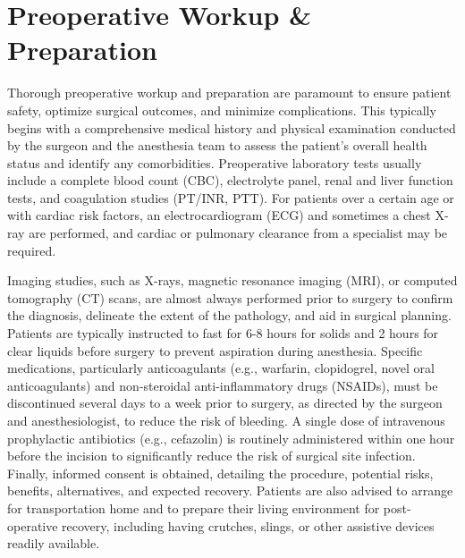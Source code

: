 \section*{Preoperative Workup \& Preparation}
Thorough preoperative workup and preparation are paramount to ensure patient safety, optimize surgical outcomes, and minimize complications. This typically begins with a comprehensive medical history and physical examination conducted by the surgeon and the anesthesia team to assess the patient's overall health status and identify any comorbidities. Preoperative laboratory tests usually include a complete blood count (CBC), electrolyte panel, renal and liver function tests, and coagulation studies (PT/INR, PTT). For patients over a certain age or with cardiac risk factors, an electrocardiogram (ECG) and sometimes a chest X-ray are performed, and cardiac or pulmonary clearance from a specialist may be required.

Imaging studies, such as X-rays, magnetic resonance imaging (MRI), or computed tomography (CT) scans, are almost always performed prior to surgery to confirm the diagnosis, delineate the extent of the pathology, and aid in surgical planning. Patients are typically instructed to fast for 6-8 hours for solids and 2 hours for clear liquids before surgery to prevent aspiration during anesthesia. Specific medications, particularly anticoagulants (e.g., warfarin, clopidogrel, novel oral anticoagulants) and non-steroidal anti-inflammatory drugs (NSAIDs), must be discontinued several days to a week prior to surgery, as directed by the surgeon and anesthesiologist, to reduce the risk of bleeding. A single dose of intravenous prophylactic antibiotics (e.g., cefazolin) is routinely administered within one hour before the incision to significantly reduce the risk of surgical site infection. Finally, informed consent is obtained, detailing the procedure, potential risks, benefits, alternatives, and expected recovery. Patients are also advised to arrange for transportation home and to prepare their living environment for post-operative recovery, including having crutches, slings, or other assistive devices readily available.

